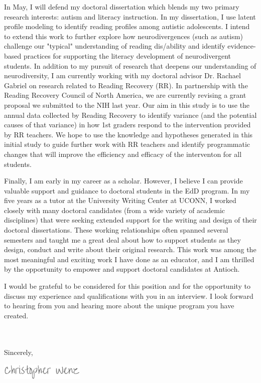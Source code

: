 \documentclass[11pt, a4paper]{awesome-cv}
\begin{document}
\begin{cvletter}
In May, I will defend my doctoral dissertation which blends my two primary research interests: autism and literacy instruction. In my dissertation, I use latent profile modeling to identify reading profiles among autistic adolescents. I intend to extend this work to further explore how neurodivergences (such as autism) challenge our "typical" understanding of reading dis/ability and identify evidence-based practices for supporting the literacy development of neurodivergent students. In addition to my pursuit of research that deepens our understanding of neurodiversity, I am currently working with my doctoral advisor Dr. Rachael Gabriel on research related to Reading Recovery (RR). In partnership with the Reading Recovery Council of North America, we are currently revising a grant proposal we submitted to the NIH last year. Our aim in this study is to use the annual data collected by Reading Recovery to identify variance (and the potential causes of that variance) in how 1st graders respond to the intervention provided by RR teachers. We hope to use the knowledge and hypotheses generated in this initial study to guide further work with RR teachers and identify programmatic changes that will improve the efficiency and efficacy of the interventon for all students. 

Finally, I am early in my career as a scholar. However, I believe I can provide valuable support and guidance to doctoral students in the EdD program. In my five years as a tutor at the University Writing Center at UCONN, I worked closely with many doctoral candidates (from a wide variety of academic disciplines) that were seeking extended support for the writing and design of their doctoral dissertations. These working relationships often spanned several semesters and taught me a great deal about how to support students as they design, conduct and write about their original research. This work was among the most meaningful and exciting work I have done as an educator, and I am thrilled by the opportunity to empower and support doctoral candidates at Antioch. 

I would be grateful to be considered for this position and for the opportunity to discuss my experience and qualifications with you in an interview. I look forward to hearing from you and hearing more about the unique program you have created. 


\\\\
Sincerely,
\end{cvletter}



\includegraphics[width=4cm, height=0.8cm]{./img/sig.png}
\end{document}
